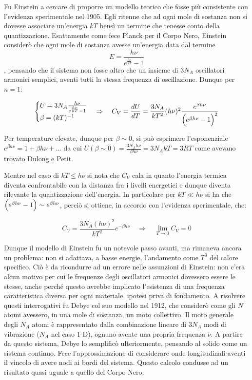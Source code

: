Fu Einstein a cercare di proporre un modello teorico che fosse più consistente con l'evidenza sperimentale nel 1905.
Egli ritenne che ad ogni mole di sostanza non si dovesse associare un'energia $kT$ bensì un termine che tenesse conto della quantizzazione.
Esattamente come fece Planck per il Corpo Nero, Einstein considerò che ogni mole di sostanza avesse un'energia data dal termine
$$E = \frac{ h \nu}{e^{ \frac{ h\nu}{k T } } - 1 }$$, 
pensando che il sistema non fosse altro che un insieme di $3 N_A$ oscillatori armonici semplici, aventi tutti la stessa frequenza di oscillazione.
Dunque per $n=1$:

\begin{equation}
\begin{cases}
	U = 3 N_A \frac{ h \nu}{e^{ \frac{ h \nu}{ k T} } - 1 } \\
	\beta = (k T)^{ -1 }
\end{cases}
\Rightarrow \quad C_V = \frac{ dU}{dT } = \frac{ 3 N_A}{k T^2 } (h \nu)^2 \frac{ e^{ \beta h \nu }}{\Bigl(  e^{ \beta h \nu } - 1   \Bigr)^2}
\end{equation}

Per temperature elevate, dunque per $\beta \sim 0$, si può esprimere l'esponenziale $e^{ \beta h \nu } = 1 + \beta h \nu + ...$
da cui $U(\beta \sim 0) = \frac{ 3 N_A h \nu}{\beta h \nu } = 3 N_A k T = 3 R T$ come avevano trovato Dulong e Petit.

Mentre nel caso di $k T \leq h \nu$ si nota che $C_V$ cala in quanto l'energia termica diventa confrontabile con la distanza fra i livelli energetici e dunque diventa rilevante la quantizzazione dell'energia.
In particolare per $k T \ll h \nu$ si ha che $\Bigl(  e^{ \beta h \nu } - 1  \Bigr) \sim e^{ \beta h \nu }$, perciò si ottiene, in accordo con l'evidenza sperimentale, che:

\begin{equation}
C_V = \frac{ 3 N_A (h \nu)^2}{k T^2 }e^{ - \beta h \nu } \quad \Rightarrow \quad \lim_{T \to 0} C_V = 0
\end{equation}

Dunque il modello di Einstein fu un notevole passo avanti, ma rimaneva ancora un problema: non si adattava, a basse energie, l'andamento come $T^3$ del calore specifico.
Ciò è da ricondurre ad un errore nelle assunzioni di Einstein: non c'era alcun motivo per cui le frequenze degli oscillatori armonici dovessero essere le stesse, anche perché questo avrebbe implicato l'esistenza di una frequenza caratteristica diversa per ogni materiale, ipotesi priva di fondamento.
A risolvere questi interrogativi fu Debye col suo modello nel 1912, che considerò come gli $N$ atomi avessero, in una mole di sostanza, un moto collettivo.
Il moto generale degli $N_A$ atomi è rappresentato dalla combinazione lineare di $3N_A$ modi di vibrazione ($N_A$ nel caso 1-D), ognuno avente una propria frequenza $\nu$.
A partire da questo sistema, Debye lo semplificò ulteriormente, pensando al solido come un sistema continuo.
Fece l'approssimazione di considerare onde longitudinali aventi il vincolo di avere nodi ai bordi del sistema.
Questo calcolo condusse ad un risultato quasi uguale a quello del Corpo Nero:

